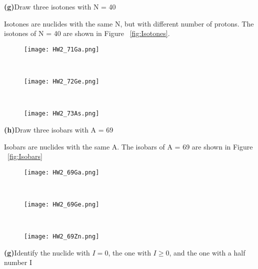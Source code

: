 \documentclass[11pt]{article}
\renewcommand{\part}[1] {\vspace{.10in} {\bf (#1)}}
\begin{document}
\part{g}{Draw three isotones with N = 40}

Isotones are nuclides with the same N, but with different number of protons.
The isotones of N = 40 are shown in Figure ~\ref{fig:Isotones}.
\begin{figure*}[!ht]
	\centering
	\begin{subfigure}[b]{0.3\textwidth}
		\centering
		\texttt{[image: HW2\_71Ga.png]}
	\end{subfigure}%
	~
	\begin{subfigure}[b]{0.3\textwidth}
		\centering
		\texttt{[image: HW2\_72Ge.png]}
	\end{subfigure}%
	~
	\begin{subfigure}[b]{0.3\textwidth}
		\centering
		\texttt{[image: HW2\_73As.png]}
	\end{subfigure}
	\caption{Isotones of N = 40}
	\label{fig:Isotones}
\end{figure*}

\part{h}{Draw three isobars with A = 69}

Isobars are nuclides with the same A.
The isobars of A = 69 are shown in Figure ~\ref{fig:Isobars}
\begin{figure*}[!ht]
	\centering
	\begin{subfigure}[b]{0.3\textwidth}
		\centering
		\texttt{[image: HW2\_69Ga.png]}
	\end{subfigure}%
	~
	\begin{subfigure}[b]{0.3\textwidth}
		\centering
		\texttt{[image: HW2\_69Ge.png]}
	\end{subfigure}%
	~
	\begin{subfigure}[b]{0.3\textwidth}
		\centering
		\texttt{[image: HW2\_69Zn.png]}
	\end{subfigure}
	\caption{Isobars of A = 69}
	\label{fig:Isobars}
\end{figure*}

\part{g}{Identify the nuclide with $I=0$, the one with $I\ge0$, and the one with a half number I}
\end{document}
